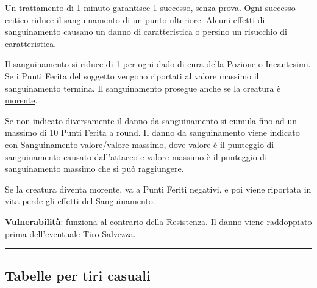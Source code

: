 \begin{multicols}{2}
Un trattamento di 1 minuto garantisce 1 successo, senza prova. Ogni successo critico riduce il sanguinamento di un punto ulteriore. Alcuni effetti di sanguinamento causano un danno di caratteristica o persino un risucchio di caratteristica.

Il sanguinamento si riduce di 1 per ogni dado di cura della Pozione o Incantesimi. Se i Punti Ferita del soggetto vengono riportati al valore massimo il sanguinamento termina. Il sanguinamento prosegue anche se la creatura è \hyperlink{morente}{morente}.

Se non indicato diversamente il danno da sanguinamento si cumula fino ad un massimo di 10 Punti Ferita a round. Il danno da sanguinamento viene indicato con Sanguinamento valore/valore massimo, dove valore è il punteggio di sanguinamento causato dall'attacco e valore massimo è il punteggio di sanguinamento massimo che si può raggiungere.

Se la creatura diventa morente, va a Punti Feriti negativi, e poi viene riportata in vita perde gli effetti del Sanguinamento.

\textbf{Vulnerabilità}: funziona al contrario della Resistenza. Il danno viene raddoppiato prima dell'eventuale Tiro Salvezza.

\end{multicols}

\noindent\rule{\textwidth}{0.4pt}

\subsection{Tabelle per tiri casuali}

